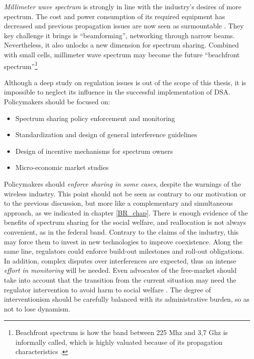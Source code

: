 \textit{Millimeter wave spectrum} is strongly in line with the industry's desires of more spectrum. The cost and power consumption of its required equipment has decreased and previous propagation issues are now seen as surmountable \cite{ref:Andrews2014}. They key challenge it brings is \enquote{beamforming}, networking through narrow beams. Nevertheless, it also unlocks a new dimension for spectrum sharing. Combined with small cells, millimeter wave spectrum may become the future \enquote{beachfront spectrum}\footnote{Beachfront spectrum is how the band between 225 Mhz and 3,7 Ghz is informally called, which is highly valuated because of its propagation characteristics \cite{AdvisorsonScience}.}

Although a deep study on regulation issues is out of the scope of this thesis, it is impossible to neglect its influence in the successful implementation of DSA. Policymakers should be focused on: 
\begin{itemize}
\item Spectrum sharing policy enforcement and monitoring
\item Standardization and design of general interference guidelines
\item Design of incentive mechanisms for spectrum owners
\item Micro-economic market studies 
\end{itemize} 

Policymakers should \textit{enforce sharing in some cases}, despite the warnings of the wireless industry. This point should not be seen as contrary to our motivation or to the previous discussion, but more like a complementary and simultaneous approach, as we indicated in chapter \ref{BR_chap}. There is enough evidence of the benefits of  spectrum sharing for the social welfare, and reallocation is not always convenient, as in the federal band. Contrary to the claims of the industry, this may force them to invest in new technologies to improve coexistence. Along the same line, regulators could enforce build-out milestones and roll-out obligations. In addition, complex disputes over interferences are expected, thus an intense \textit{effort in monitoring} will be needed. Even advocates of the free-market should take into account that the transition from the current situation may need the regulator intervention to avoid harm to social welfare \cite{ref:Yoon2012}. The degree of interventionism should be carefully balanced with its administrative burden, so as not to lose dynamism. 

